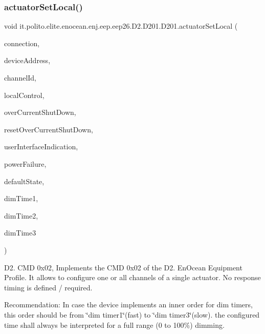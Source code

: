 \subsubsection{\texorpdfstring{actuator\+Set\+Local()}{actuatorSetLocal()}}
{\footnotesize\ttfamily void it.\+polito.\+elite.\+enocean.\+enj.\+eep.\+eep26.\+D2.\+D201.\+D201.\+actuator\+Set\+Local (\begin{DoxyParamCaption}\item[{\hyperlink{classit_1_1polito_1_1elite_1_1enocean_1_1enj_1_1communication_1_1_en_j_connection}{En\+J\+Connection}}]{connection,  }\item[{byte \mbox{[}$\,$\mbox{]}}]{device\+Address,  }\item[{byte}]{channel\+Id,  }\item[{byte}]{local\+Control,  }\item[{byte}]{over\+Current\+Shut\+Down,  }\item[{byte}]{reset\+Over\+Current\+Shut\+Down,  }\item[{byte}]{user\+Interface\+Indication,  }\item[{byte}]{power\+Failure,  }\item[{byte}]{default\+State,  }\item[{\hyperlink{enumit_1_1polito_1_1elite_1_1enocean_1_1enj_1_1eep_1_1eep26_1_1_d2_1_1_d201_1_1_d201_dim_time}{D201\+Dim\+Time}}]{dim\+Time1,  }\item[{\hyperlink{enumit_1_1polito_1_1elite_1_1enocean_1_1enj_1_1eep_1_1eep26_1_1_d2_1_1_d201_1_1_d201_dim_time}{D201\+Dim\+Time}}]{dim\+Time2,  }\item[{\hyperlink{enumit_1_1polito_1_1elite_1_1enocean_1_1enj_1_1eep_1_1eep26_1_1_d2_1_1_d201_1_1_d201_dim_time}{D201\+Dim\+Time}}]{dim\+Time3 }\end{DoxyParamCaption})}

D2. C\+MD 0x02, Implements the C\+MD 0x02 of the D2. En\+Ocean Equipment Profile. It allows to configure one or all channels of a single actuator. No response timing is defined / required.

Recommendation\+: In case the device implements an inner order for dim timers, this order should be from \char`\"{}dim timer1\char`\"{}(fast) to \char`\"{}dim timer3\char`\"{}(slow). the configured time shall always be interpreted for a full range (0 to 100\%) dimming.


